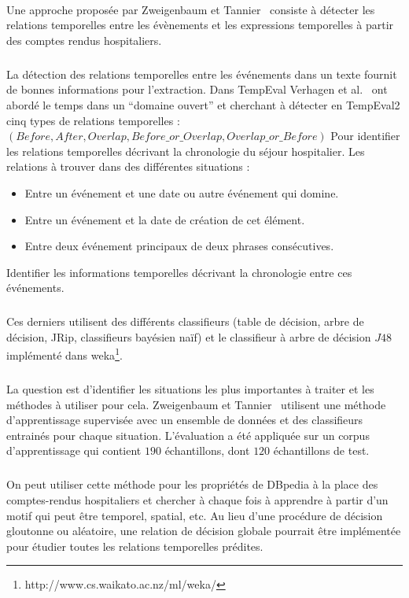 \paragraph{}
Une approche proposée par Zweigenbaum et Tannier~\cite{zweigenbaum2013} consiste à détecter les relations temporelles entre les évènements et les expressions temporelles à partir des comptes rendus hospitaliers.
\subparagraph{}
La détection des relations temporelles entre les événements dans un texte fournit de bonnes informations pour l’extraction.
\newline
Dans TempEval Verhagen et al.~\cite{verhagen2010} ont abordé le temps dans un ``domaine ouvert” et cherchant à détecter en TempEval2 cinq types de relations temporelles :
\newline
$(Before, After, Overlap, Before\_or\_Overlap, Overlap\_or\_Before)$
Pour identifier les relations temporelles décrivant la chronologie du séjour hospitalier.
\newline
Les relations à trouver dans des différentes situations :
\begin{itemize}
\item{}Entre un événement et une date ou autre événement qui domine.
\item{}Entre un événement et la date de création de cet élément.
\item{}Entre deux événement principaux de deux phrases consécutives.
\end{itemize}
Identifier les informations temporelles décrivant la chronologie entre ces événements.
\subparagraph{}
Ces derniers utilisent des différents classifieurs (table de décision, arbre de décision, JRip, classifieurs bayésien naïf) et le classifieur à arbre de décision $J48$ implémenté dans weka\footnote{http://www.cs.waikato.ac.nz/ml/weka/}.
\subparagraph{}
La question est d’identifier les situations les plus importantes à traiter et les méthodes à utiliser pour cela.
Zweigenbaum et Tannier~\cite{zweigenbaum2013} utilisent une méthode d’apprentissage supervisée avec un ensemble de données et des classifieurs entrainés pour chaque situation.
L'évaluation a été appliquée sur un corpus d’apprentissage qui contient $190$ échantillons, dont $120$ échantillons de test.
\subparagraph{}
On peut utiliser cette méthode pour les propriétés de DBpedia à la place des comptes-rendus hospitaliers et chercher à chaque fois à apprendre à partir d'un motif qui peut être temporel, spatial, etc.
Au lieu d’une procédure de décision gloutonne ou aléatoire, une relation de décision globale pourrait être implémentée pour étudier toutes les relations temporelles prédites.
